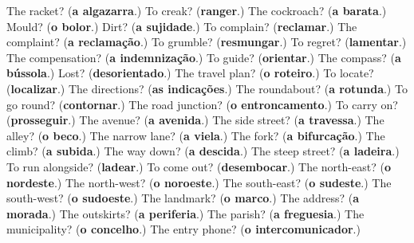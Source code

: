 \begin{tcolorbox}[breakable,colback=teal!4,colframe=teal!35!black,title={Before you move on}]
The racket? (\textbf{a algazarra}.) To creak? (\textbf{ranger}.) The cockroach? (\textbf{a barata}.) Mould? (\textbf{o bolor}.) Dirt? (\textbf{a sujidade}.) To complain? (\textbf{reclamar}.) The complaint? (\textbf{a reclamação}.) To grumble? (\textbf{resmungar}.) To regret? (\textbf{lamentar}.) The compensation? (\textbf{a indemnização}.) To guide? (\textbf{orientar}.) The compass? (\textbf{a bússola}.) Lost? (\textbf{desorientado}.) The travel plan? (\textbf{o roteiro}.) To locate? (\textbf{localizar}.) The directions? (\textbf{as indicações}.) The roundabout? (\textbf{a rotunda}.) To go round? (\textbf{contornar}.) The road junction? (\textbf{o entroncamento}.) To carry on? (\textbf{prosseguir}.) The avenue? (\textbf{a avenida}.) The side street? (\textbf{a travessa}.) The alley? (\textbf{o beco}.) The narrow lane? (\textbf{a viela}.) The fork? (\textbf{a bifurcação}.) The climb? (\textbf{a subida}.) The way down? (\textbf{a descida}.) The steep street? (\textbf{a ladeira}.) To run alongside? (\textbf{ladear}.) To come out? (\textbf{desembocar}.) The north-east? (\textbf{o nordeste}.) The north-west? (\textbf{o noroeste}.) The south-east? (\textbf{o sudeste}.) The south-west? (\textbf{o sudoeste}.) The landmark? (\textbf{o marco}.) The address? (\textbf{a morada}.) The outskirts? (\textbf{a periferia}.) The parish? (\textbf{a freguesia}.) The municipality? (\textbf{o concelho}.) The entry phone? (\textbf{o intercomunicador}.)
\end{tcolorbox}

